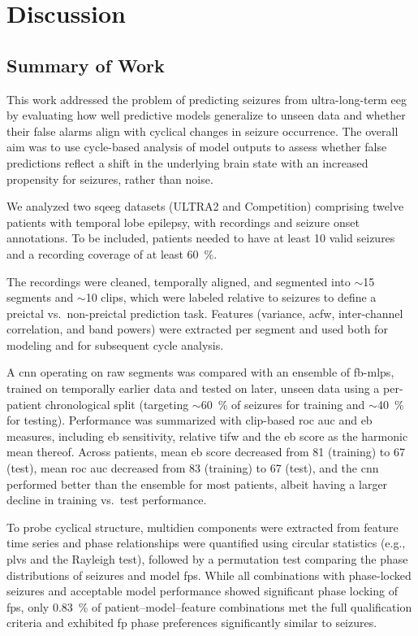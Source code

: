 \chapter{Discussion}\label{ch:discussion}


\section{Summary of Work}
This work addressed the problem of predicting seizures from ultra-long-term \gls{eeg} by evaluating how well predictive models generalize to unseen data and whether their false alarms align with cyclical changes in seizure occurrence.
The overall aim was to use cycle-based analysis of model outputs to assess whether false predictions reflect a shift in the underlying brain state with an increased propensity for seizures, rather than noise.

We analyzed two \gls{sqeeg} datasets (ULTRA2 and Competition) comprising twelve patients with temporal lobe epilepsy, with recordings and seizure onset annotations.
To be included, patients needed to have at least 10 valid seizures and a recording coverage of at least \SI{60}{\percent}.

The recordings were cleaned, temporally aligned, and segmented into $\sim$\SI{15}{\sec} segments and $\sim$\SI{10}{\min} clips, which were labeled relative to seizures to define a preictal vs.\ non-preictal prediction task.
Features (variance, \gls{acfw}, inter-channel correlation, and band powers) were extracted per segment and used both for modeling and for subsequent cycle analysis.

A \gls{cnn} operating on raw segments was compared with an ensemble of \glspl{fb-mlp}, trained on temporally earlier data and tested on later, unseen data using a per-patient chronological split (targeting $\sim$\SI{60}{\percent} of seizures for training and $\sim$\SI{40}{\percent} for testing).
Performance was summarized with clip-based \gls{roc auc} and \gls{eb} measures, including \gls{eb} sensitivity, relative \gls{tifw} and the \gls{eb} score as the harmonic mean thereof.
Across patients, mean \gls{eb} score decreased from 81 (training) to 67 (test), mean \gls{roc auc} decreased from 83 (training) to 67 (test), and the \gls{cnn} performed better than the ensemble for most patients, albeit having a larger decline in training vs.\ test performance.

To probe cyclical structure, multidien components were extracted from feature time series and phase relationships were quantified using circular statistics (e.g., \glspl{plv} and the Rayleigh test), followed by a permutation test comparing the phase distributions of seizures and model \glspl{fp}.
While all combinations with phase-locked seizures and acceptable model performance showed significant phase locking of \glspl{fp}, only \SI{0.83}{\percent} of patient--model--feature combinations met the full qualification criteria and exhibited \gls{fp} phase preferences significantly similar to seizures.

